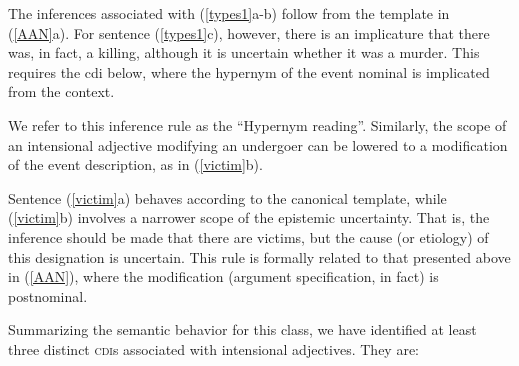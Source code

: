 \documentclass[10pt]{article}
\begin{document}
\noindent The inferences associated with (\ref{types1}a-b) follow from the template in (\ref{AAN}a). For 
sentence (\ref{types1}c), however, there is an implicature that there was, in fact, a killing, although it is uncertain whether it was a murder. This requires the {\sc cdi}  below, where the hypernym of the event nominal is implicated from the context.

\vspace{-0.5em}
\vspace{-0.5em}

\noindent We refer to this inference rule as the ``Hypernym reading''. 
Similarly, the scope of an intensional adjective modifying an undergoer can be lowered to a modification of the event description, as  in (\ref{victim}b). 

\vspace{-0.5em}
\vspace{-0.5em}


\noindent Sentence  (\ref{victim}a) behaves according to the canonical template, while  (\ref{victim}b) involves a narrower scope of the epistemic uncertainty. That is, the inference should be made that there are victims, but the cause (or etiology) of this designation is uncertain. This rule is formally related to that presented above in (\ref{AAN}), where the modification (argument specification, in fact) is postnominal. 

\vspace{-0.5em}
\vspace{-0.5em}


\noindent Summarizing the semantic behavior for this class, we have identified at least three distinct \textsc{cdi}s associated with intensional  adjectives. They are:
\end{document}
